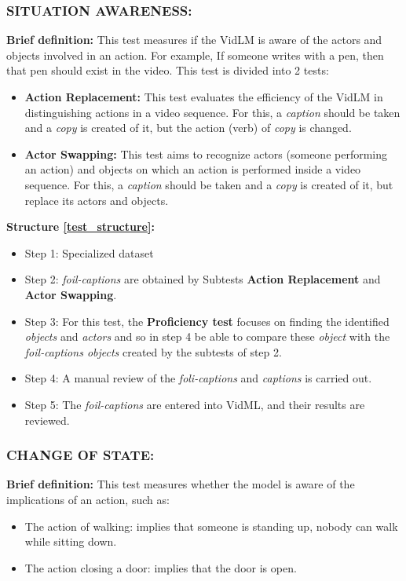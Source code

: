 \subsubsection{SITUATION AWARENESS:}
\textbf{Brief definition:}
This test measures if the VidLM is aware of the actors and objects involved in an action. For example, If someone writes with a pen, then that pen should exist in the video.
This test is divided into 2 tests:
\begin{itemize}
\item \textbf{Action Replacement:} This test evaluates the efficiency of the VidLM in distinguishing actions in a video sequence. For this, a \textit{caption} should be taken and a \textit{copy} is created of it, but the action (verb) of \textit{copy} is changed.
\item \textbf{Actor Swapping:} This test aims to recognize actors (someone performing an action) and objects on which an action is performed inside a video sequence. For this, a \textit{caption} should be taken and a \textit{copy} is created of it, but replace its actors and objects.
\end{itemize}
\textbf{Structure \ref{test_structure}:}
\begin{itemize}
\item Step 1: Specialized dataset
\item Step 2: \textit{foil-captions} are obtained by Subtests \textbf{Action Replacement} and \textbf{Actor Swapping}.
\item Step 3: For this test, the \textbf{Proficiency test} focuses on finding the identified \textit{objects} and \textit{actors} and so in step 4 be able to compare these \textit{object} with the \textit{foil-captions objects} created by the subtests of step 2.
\item Step 4: A manual review of the \textit{foli-captions} and \textit{captions} is carried out.
\item Step 5: The \textit{foil-captions} are entered into VidML, and their results are reviewed.
\end{itemize}
\subsubsection{CHANGE OF STATE:}
\textbf{Brief definition:}
This test measures whether the model is aware of the implications of an action, such as:
\begin{itemize}
\item The action of walking: implies that someone is standing up, nobody can walk while sitting down. 
\item The action closing a door: implies that the door is open.
\end{itemize}

